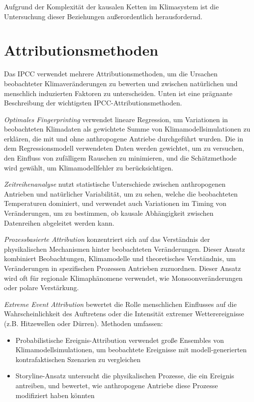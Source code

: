 \documentclass[12pt,paper=a4,DIV=12,parskip=never,chapterprefix=false,headings=standardclasses]{scrreprt}
\begin{document}
Aufgrund der Komplexität der kausalen Ketten im Klimasystem ist die Untersuchung dieser Beziehungen außerordentlich herausfordernd.


\section{Attributionsmethoden}
Das IPCC verwendet mehrere Attributionsmethoden, um die Ursachen beobachteter Klimaveränderungen zu bewerten und zwischen natürlichen und menschlich induzierten Faktoren zu unterscheiden. Unten ist eine prägnante Beschreibung der wichtigsten IPCC-Attributionsmethoden.

\emph{Optimales Fingerprinting} verwendet lineare Regression, um Variationen in beobachteten Klimadaten als gewichtete Summe von Klimamodellsimulationen zu erklären, die mit und ohne anthropogene Antriebe durchgeführt wurden. Die in dem Regressionsmodell verwendeten Daten werden gewichtet, um zu versuchen, den Einfluss von zufälligem Rauschen zu minimieren, und die Schätzmethode wird gewählt, um Klimamodellfehler zu berücksichtigen.

\emph{Zeitreihenanalyse} nutzt statistische Unterschiede zwischen anthropogenen Antrieben und natürlicher Variabilität, um zu sehen, welche die beobachteten Temperaturen dominiert, und verwendet auch Variationen im Timing von Veränderungen, um zu bestimmen, ob kausale Abhängigkeit zwischen Datenreihen abgeleitet werden kann.

\emph{Prozessbasierte Attribution} konzentriert sich auf das Verständnis der physikalischen Mechanismen hinter beobachteten Veränderungen. Dieser Ansatz kombiniert Beobachtungen, Klimamodelle und theoretisches Verständnis, um Veränderungen in spezifischen Prozessen Antrieben zuzuordnen. Dieser Ansatz wird oft für regionale Klimaphänomene verwendet, wie Monsoonveränderungen oder polare Verstärkung.

\emph{Extreme Event Attribution} bewertet die Rolle menschlichen Einflusses auf die Wahrscheinlichkeit des Auftretens oder die Intensität extremer Wetterereignisse (z.B. Hitzewellen oder Dürren). Methoden umfassen:

\begin{itemize}
\item Probabilistische Ereignis-Attribution verwendet große Ensembles von Klimamodellsimulationen, um beobachtete Ereignisse mit modell-generierten kontrafaktischen Szenarien zu vergleichen
\item Storyline-Ansatz untersucht die physikalischen Prozesse, die ein Ereignis antreiben, und bewertet, wie anthropogene Antriebe diese Prozesse modifiziert haben könnten
\end{itemize}
\end{document}
